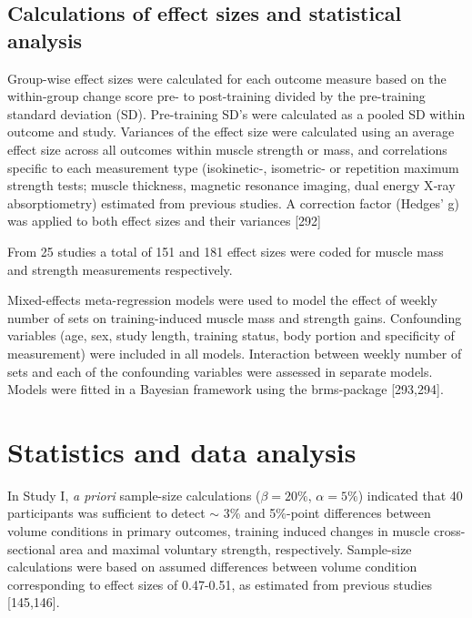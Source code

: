 \documentclass[twoside,10pt]{gihclass} %
\begin{document}
\hypertarget{calculations-of-effect-sizes-and-statistical-analysis}{%
\subsection{Calculations of effect sizes and statistical analysis}\label{calculations-of-effect-sizes-and-statistical-analysis}}

Group-wise effect sizes were calculated for each outcome measure based
on the within-group change score pre- to post-training divided by the
pre-training standard deviation (SD). Pre-training SD's were calculated
as a pooled SD within outcome and study. Variances of the effect size
were calculated using an average effect size across all outcomes within
muscle strength or mass, and correlations specific to each measurement
type (isokinetic-, isometric- or repetition maximum strength tests;
muscle thickness, magnetic resonance imaging, dual energy X‐ray
absorptiometry) estimated from previous studies.
A correction factor (Hedges' g) was applied to both effect sizes and their
variances
{[}292{]}

From 25 studies a total of 151 and 181 effect sizes were coded for muscle mass and strength measurements respectively.

Mixed-effects meta-regression models were used to model the effect of
weekly number of sets on training-induced muscle mass and strength gains.
Confounding variables (age, sex, study length, training status, body portion and specificity of measurement) were included in all models. Interaction between weekly number of sets and each of the confounding variables were assessed in separate models.
Models were fitted in a Bayesian framework using the brms-package
{[}293,294{]}.

\hypertarget{statistics-and-data-analysis}{%
\section{Statistics and data analysis}\label{statistics-and-data-analysis}}

In Study I, \emph{a priori} sample-size calculations (\(\beta=20\%\), \(\alpha=5\%\)) indicated that 40 participants was sufficient to detect \(\sim\) 3\% and 5\%-point differences between volume conditions in primary outcomes, training induced changes in muscle cross-sectional area and maximal voluntary strength, respectively. Sample-size calculations were based on assumed differences between volume condition corresponding to effect sizes of 0.47-0.51, as estimated from previous studies {[}145,146{]}.
\end{document}
